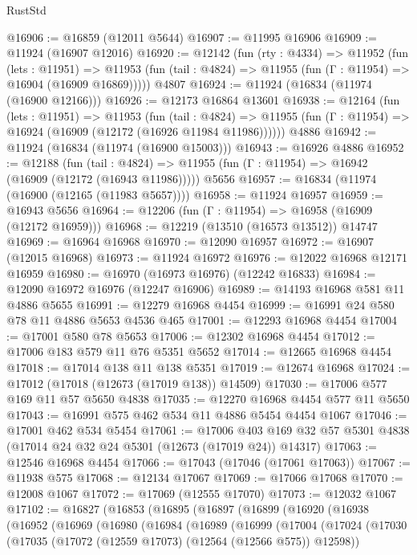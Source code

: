\begin{lexlean}{RustStd}
\begin{coremodule}
{\begin{coremodule}
{{{{{{{{{{{{{{{{{{{{{{{{{{{{{{{{{{{{{{{{{{{{{{{{{{{{{{{{{{{{{{{{{{{{{{{{{{{{{{{{@16906 := @16859 (@12011 @5644)
@16907 := @11995 @16906
@16909 := @11924 (@16907 @12016)
@16920 := @12142
    (fun (rty : @4334) =>
    @11952
      (fun (lets : @11951) =>
      @11953 (fun (tail : @4824) => @11955 (fun (Γ : @11954) => @16904 (@16909 @16869)))))
    @4807
@16924 := @11924 (@16834 (@11974 (@16900 @12166)))
@16926 := @12173 @16864 @13601
@16938 := @12164
    (fun (lets : @11951) =>
    @11953
      (fun (tail : @4824) =>
      @11955 (fun (Γ : @11954) => @16924 (@16909 (@12172 (@16926 @11984 @11986))))))
    @4886
@16942 := @11924 (@16834 (@11974 (@16900 @15003)))
@16943 := @16926 @4886
@16952 := @12188
    (fun (tail : @4824) => @11955 (fun (Γ : @11954) => @16942 (@16909 (@12172 (@16943 @11986)))))
    @5656
@16957 := @16834 (@11974 (@16900 (@12165 (@11983 @5657))))
@16958 := @11924 @16957
@16959 := @16943 @5656
@16964 := @12206 (fun (Γ : @11954) => @16958 (@16909 (@12172 @16959)))
@16968 := @12219 (@13510 (@16573 @13512)) @14747
@16969 := @16964 @16968
@16970 := @12090 @16957
@16972 := @16907 (@12015 @16968)
@16973 := @11924 @16972
@16976 := @12022 @16968 @12171 @16959
@16980 := @16970 (@16973 @16976) (@12242 @16833)
@16984 := @12090 @16972 @16976 (@12247 @16906)
@16989 := @14193 @16968 @581 @11 @4886 @5655
@16991 := @12279 @16968 @4454
@16999 := @16991 @24 @580 @78 @11 @4886 @5653 @4536 @465
@17001 := @12293 @16968 @4454
@17004 := @17001 @580 @78 @5653
@17006 := @12302 @16968 @4454
@17012 := @17006 @183 @579 @11 @76 @5351 @5652
@17014 := @12665 @16968 @4454
@17018 := @17014 @138 @11 @138 @5351
@17019 := @12674 @16968
@17024 := @17012 (@17018 (@12673 (@17019 @138)) @14509)
@17030 := @17006 @577 @169 @11 @57 @5650 @4838
@17035 := @12270 @16968 @4454 @577 @11 @5650
@17043 := @16991 @575 @462 @534 @11 @4886 @5454 @4454 @1067
@17046 := @17001 @462 @534 @5454
@17061 := @17006
    @403
    @169
    @32
    @57
    @5301
    @4838
    (@17014 @24 @32 @24 @5301 (@12673 (@17019 @24)) @14317)
@17063 := @12546 @16968 @4454
@17066 := @17043 (@17046 (@17061 @17063))
@17067 := @11938 @575
@17068 := @12134 @17067
@17069 := @17066 @17068
@17070 := @12008 @1067
@17072 := @17069 (@12555 @17070)
@17073 := @12032 @1067
@17102 := @16827
    (@16853
      (@16895
        (@16897
          (@16899
            (@16920
              (@16938
                (@16952
                  (@16969
                    (@16980
                      (@16984
                        (@16989
                          (@16999
                            (@17004
                              (@17024
                                (@17030
                                  (@17035 (@17072 (@12559 @17073) (@12564 (@12566 @575)) @12598))
}}}}}}}}}}}}}}}}}}}}}}}}}}}}}}}}}}}}}}}}}}}}}}}}}}}}}}}}}}}}}}}}}}}}}}}}}}}}}}}}
\end{coremodule}}
\end{coremodule}
\end{lexlean}
